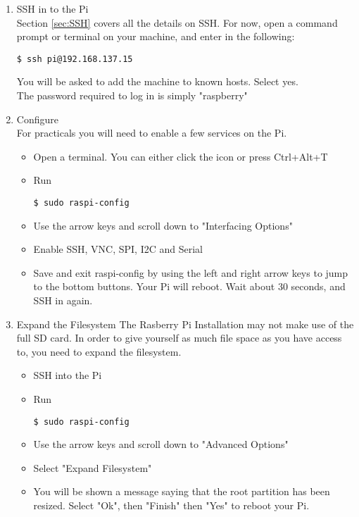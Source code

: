\begin{enumerate}
    \item SSH in to the Pi\\
        Section \ref{sec:SSH} covers all the details on SSH. For now, open a command prompt or terminal on your machine, and enter in the following:
        \begin{lstlisting}[gobble=8]
        $ ssh pi@192.168.137.15
        \end{lstlisting}
        You will be asked to add the machine to known hosts. Select yes.\\
        The password required to log in is simply "raspberry"
    \item Configure\\
        For practicals you will need to enable a few services on the Pi.
        \begin{itemize}
            \item Open a terminal. You can either click the icon or press Ctrl+Alt+T
            \item Run
            \begin{lstlisting}[gobble=12]
            $ sudo raspi-config
            \end{lstlisting}
            \item Use the arrow keys and scroll down to "Interfacing Options"
            \item Enable SSH, VNC, SPI, I2C and Serial
            \item Save and exit raspi-config by using the left and right arrow keys to jump to the bottom buttons. Your Pi will reboot. Wait about 30 seconds, and SSH in again.
        \end{itemize}
    \item Expand the Filesystem
        The Rasberry Pi Installation may not make use of the full SD card. In order to give yourself as much file space as you have access to, you need to expand the filesystem.
        \begin{itemize}
            \item SSH into the Pi
            \item Run
            \begin{lstlisting}[gobble=12]
            $ sudo raspi-config
            \end{lstlisting}
            \item Use the arrow keys and scroll down to "Advanced Options"
            \item Select "Expand Filesystem"
            \item You will be shown a message saying that the root partition has been resized. Select "Ok", then "Finish" then "Yes" to reboot your Pi.

\end{itemize}
\end{enumerate}
